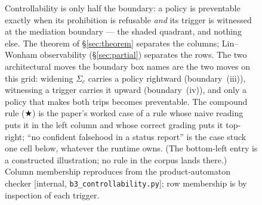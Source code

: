 \begin{figure}[t]
\caption{Controllability is only half the boundary: a policy is preventable exactly when its prohibition is refusable
\emph{and} its trigger is witnessed at the mediation boundary --- the shaded quadrant, and nothing else. The theorem of
\S\ref{sec:theorem} separates the columns; Lin--Wonham observability (\S\ref{sec:partial}) separates the rows. The two
architectural moves the boundary box names are the two moves on this grid: widening $\Sigma_c$ carries a policy rightward
(boundary~(iii)), witnessing a trigger carries it upward (boundary~(iv)), and only a policy that makes both trips becomes
preventable. The compound rule ($\bigstar$) is the paper's worked case of a rule whose naive reading puts it in the left
column and whose correct grading puts it top-right; ``no confident falsehood in a status report'' is the case stuck one cell
below, whatever the runtime owns. (The bottom-left entry is a constructed illustration; no rule in the corpus lands there.) Column membership reproduces from the product-automaton checker [internal, \texttt{b3\_controllability.py}]; row
membership is by inspection of each trigger.}
\label{fig:quadrant}
\end{figure}
